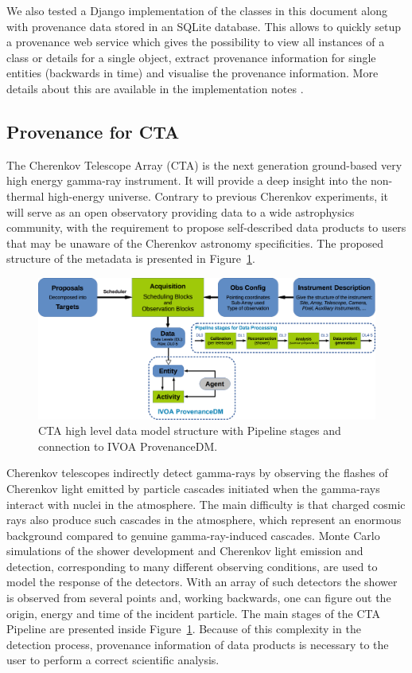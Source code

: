 We also tested a Django implementation of the classes in this document along with provenance data stored in an SQLite database. This allows to quickly setup a provenance web service
which gives the possibility to view all instances of a class or details for a single object, 
extract provenance information for single entities (backwards in time) and 
visualise the provenance information. 
More details about this are available in the implementation notes \citep{std:ProvenanceImplementationNote}.




\subsection{Provenance for CTA}

The Cherenkov Telescope Array (CTA) is the next generation ground-based very high energy gamma-ray instrument. It will provide a deep insight into the non-thermal high-energy universe. Contrary to previous Cherenkov experiments, it will serve as an open observatory providing data to a wide astrophysics community, with the requirement to propose self-described data products to users that may be unaware of the Cherenkov astronomy specificities. The proposed structure of the metadata is presented in Figure~\ref{fig:cta_dm}.

\begin{figure}
\centering
\includegraphics[width=\textwidth]{CTA_DM_high_level.png}
\caption{CTA high level data model structure with Pipeline stages and connection to IVOA ProvenanceDM.}
\label{fig:cta_dm}
\end{figure}

Cherenkov telescopes indirectly detect gamma-rays by observing the flashes of Cherenkov light emitted by particle cascades initiated when the gamma-rays interact with nuclei in the atmosphere. The main difficulty  is that charged cosmic rays also produce such cascades in the atmosphere, which represent an enormous background compared to genuine gamma-ray-induced cascades. Monte Carlo simulations of the shower development and Cherenkov light emission and detection, corresponding to many different observing conditions, are used to model the response of the detectors.  With an array of such detectors the shower is observed  from several points and, working backwards, one can figure out the origin, energy and time of the incident particle. The main stages of the CTA Pipeline are presented inside Figure~\ref{fig:cta_dm}. Because of this complexity in the detection process, provenance information of data products is necessary to the user to perform a correct scientific analysis.

